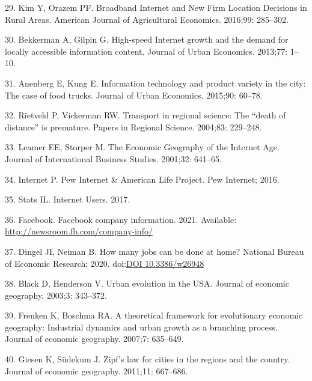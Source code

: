 \documentclass[10pt,letterpaper]{article}
\begin{document}
\leavevmode\hypertarget{ref-kim_broadband_2016}{}%
29. Kim Y, Orazem PF. Broadband Internet and New Firm Location Decisions
in Rural Areas. American Journal of Agricultural Economics. 2016;99:
285--302.

\leavevmode\hypertarget{ref-bekkerman_high-speed_2013}{}%
30. Bekkerman A, Gilpin G. High-speed Internet growth and the demand for
locally accessible information content. Journal of Urban Economics.
2013;77: 1--10.

\leavevmode\hypertarget{ref-anenberg_information_2015}{}%
31. Anenberg E, Kung E. Information technology and product variety in
the city: The case of food trucks. Journal of Urban Economics. 2015;90:
60--78.

\leavevmode\hypertarget{ref-rietveld_transport_2004}{}%
32. Rietveld P, Vickerman RW. Transport in regional science: The ``death
of distance'' is premature. Papers in Regional Science. 2004;83:
229--248.

\leavevmode\hypertarget{ref-edward_e_leamer_economic_2001}{}%
33. Leamer EE, Storper M. The Economic Geography of the Internet Age.
Journal of International Business Studies. 2001;32: 641--65.

\leavevmode\hypertarget{ref-pew_internet_pew_2016}{}%
34. Internet P. Pew Internet \& American Life Project. Pew Internet;
2016.

\leavevmode\hypertarget{ref-internet_live_stats_internet_2017}{}%
35. Stats IL. Internet Users. 2017.

\leavevmode\hypertarget{ref-fb}{}%
36. Facebook. Facebook company information. 2021. Available:
\url{http://newsroom.fb.com/company-info/}

\leavevmode\hypertarget{ref-dingel2020many}{}%
37. Dingel JI, Neiman B. How many jobs can be done at home? National
Bureau of Economic Research; 2020.
doi:\href{https://doi.org/DOI\%2010.3386/w26948}{DOI 10.3386/w26948}

\leavevmode\hypertarget{ref-black_urban_2003}{}%
38. Black D, Henderson V. Urban evolution in the USA. Journal of
economic geography. 2003;3: 343--372.

\leavevmode\hypertarget{ref-frenken_theoretical_2007}{}%
39. Frenken K, Boschma RA. A theoretical framework for evolutionary
economic geography: Industrial dynamics and urban growth as a branching
process. Journal of economic geography. 2007;7: 635--649.

\leavevmode\hypertarget{ref-giesen_zipfs_2011}{}%
40. Giesen K, Südekum J. Zipf's law for cities in the regions and the
country. Journal of economic geography. 2011;11: 667--686.
\end{document}
